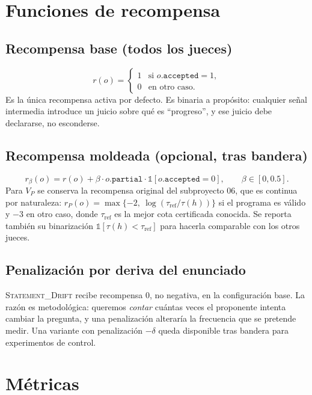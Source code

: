 \documentclass[11pt,a4paper]{article}
\begin{document}
\section{Funciones de recompensa}

\subsection{Recompensa base (todos los jueces)}
\[
  r(o) = \begin{cases} 1 & \text{si } o.\texttt{accepted} = 1,\\ 0 & \text{en otro caso.}\end{cases}
\]
Es la única recompensa activa por defecto. Es binaria a propósito: cualquier señal intermedia introduce un juicio sobre qué es ``progreso'', y ese juicio debe declararse, no esconderse.

\subsection{Recompensa moldeada (opcional, tras bandera)}
\[
  r_\beta(o) = r(o) + \beta \cdot o.\texttt{partial} \cdot \mathbb{1}[o.\texttt{accepted}=0],\qquad \beta \in [0, 0.5].
\]
Para $V_P$ se conserva la recompensa original del subproyecto 06, que es continua por naturaleza: $r_P(o) = \max\{-2,\ \log(\tau_{\mathrm{ref}}/\tau(h))\}$ si el programa es válido y $-3$ en otro caso, donde $\tau_{\mathrm{ref}}$ es la mejor cota certificada conocida. Se reporta también su binarización $\mathbb{1}[\tau(h) < \tau_{\mathrm{ref}}]$ para hacerla comparable con los otros jueces.

\subsection{Penalización por deriva del enunciado}
\textsc{Statement\_Drift} recibe recompensa $0$, no negativa, en la configuración base. La razón es metodológica: queremos \emph{contar} cuántas veces el proponente intenta cambiar la pregunta, y una penalización alteraría la frecuencia que se pretende medir. Una variante con penalización $-\delta$ queda disponible tras bandera para experimentos de control.

\section{Métricas}
\end{document}

